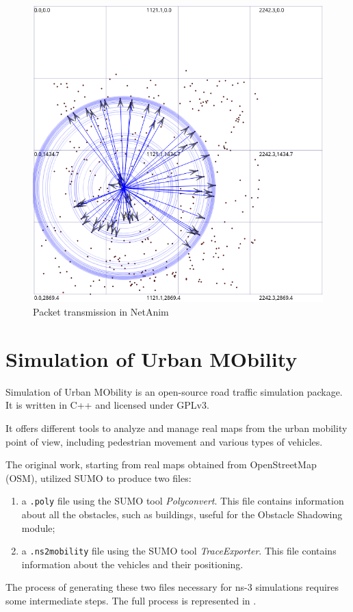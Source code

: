 			\begin{figure}[H]
				\centering
				\includegraphics[scale=0.38]{immagini/netanim}
				\caption{Packet transmission in NetAnim}
				\label{fig:netanim}
			\end{figure}
	
	\section{Simulation of Urban MObility}
		\label{sec:sumo}
		Simulation of Urban MObility is an open-source road traffic simulation package. It is written in C++ and licensed under GPLv3. 
		
		
		It offers different tools to analyze and manage real maps from the urban mobility point of view, including pedestrian movement and various types of vehicles.
		
		
		The original work, starting from real maps obtained from OpenStreetMap (OSM), \cite{ROM2017} utilized SUMO to produce two files:
		\begin{enumerate}
			\item a \texttt{.poly} file using the SUMO tool \textit{Polyconvert}. This file contains information about all the obstacles, such as buildings, useful for the Obstacle Shadowing module;
			\item a \texttt{.ns2mobility} file using the SUMO tool \textit{TraceExporter}. This file contains information about the vehicles and their positioning. 
		\end{enumerate}
		The process of generating these two files necessary for ns-3 simulations requires some intermediate steps. The full process is represented in . 
		
